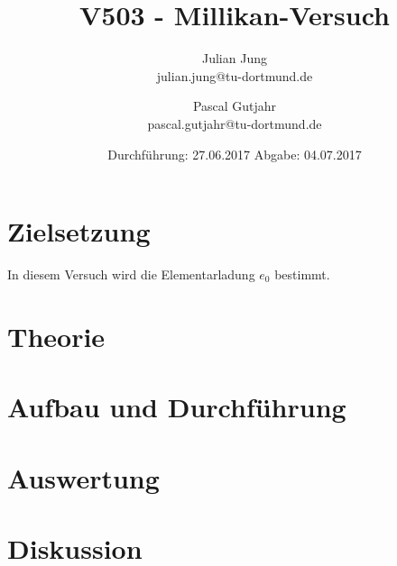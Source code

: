 

\title{V503 - Millikan-Versuch}
\author{Julian Jung \\ julian.jung@tu-dortmund.de
  \and Pascal Gutjahr \\ pascal.gutjahr@tu-dortmund.de}
  \date{Durchführung: 27.06.2017
  \hspace{3em}
  Abgabe: 04.07.2017}
  
\maketitle
\newpage
\tableofcontents
\newpage
\section{Zielsetzung}
In diesem Versuch wird die Elementarladung $e_0$ bestimmt.
\section{Theorie}
 
\section{Aufbau und Durchführung}
 
\section{Auswertung}
\section{Diskussion}
% 
\printbibliography

